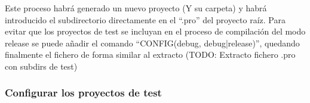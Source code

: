 Este proceso habrá generado un nuevo proyecto (Y su carpeta) y habrá introducido el subdirectorio directamente en el ``.pro'' del proyecto raíz. Para evitar que los proyectos de test se incluyan en el proceso de compilación del modo release se puede añadir el comando ``CONFIG(debug, debug|release)'', quedando finalmente el fichero de forma similar al extracto (TODO: Extracto fichero .pro con subdirs de test)

\subsubsection{Configurar los proyectos de test}





\chapterend
